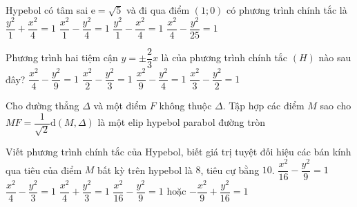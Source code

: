 \begin{ex}%
	Hypebol có tâm sai $\mathrm{e}=\sqrt{5}$ và đi qua điểm $(1;0)$ có phương trình chính tắc là
	\choice
	{$\dfrac{y^2}{1}+\dfrac{x^2}{4}=1$}
	{\True $\dfrac{x^2}{1}-\dfrac{y^2}{4}=1$}
	{$\dfrac{y^2}{1}-\dfrac{x^2}{4}=1$}
	{$\dfrac{x^2}{4}-\dfrac{y^2}{25}=1$}
\end{ex}

\begin{ex}%
	Phương trình hai tiệm cận $y= \pm \dfrac{2}{3}x$ là của phương trình chính tắc $(H)$ nào sau đây?
	\choice
	{$\dfrac{x^2}{4}-\dfrac{y^2}{9}=1$}
	{$\dfrac{x^2}{2}-\dfrac{y^2}{3}=1$}
	{\True $\dfrac{x^2}{9}-\dfrac{y^2}{4}=1$}
	{$\dfrac{x^2}{3}-\dfrac{y^2}{2}=1$}
\end{ex}

\begin{ex}%
	Cho đường thẳng $ \Delta $ và một điểm $F$ không thuộc $ \Delta $. Tập hợp các điểm $M$ sao cho $MF=\dfrac{1}{\sqrt{2}}\mathrm{d}(M, \Delta)$ là một
	\choice
	{\True elip}
	{hypebol}
	{parabol}
	{đường tròn}
\end{ex}

\begin{ex}%
	Viết phương trình chính tắc của Hypebol, biết giá trị tuyệt đối hiệu các bán kính qua tiêu của điểm $M$ bất kỳ trên hypebol là $8$, tiêu cự bằng $10$.
	\choice
	{\True $\dfrac{x^2}{16}-\dfrac{y^2}{9}=1$}
	{$\dfrac{x^2}{4}-\dfrac{y^2}{3}=1$}
	{$\dfrac{x^2}{4}+\dfrac{y^2}{3}=1$}
	{$\dfrac{x^2}{16}-\dfrac{y^2}{9}=1$ hoặc $-\dfrac{x^2}{9}+\dfrac{y^2}{16}=1$}
\end{ex}

